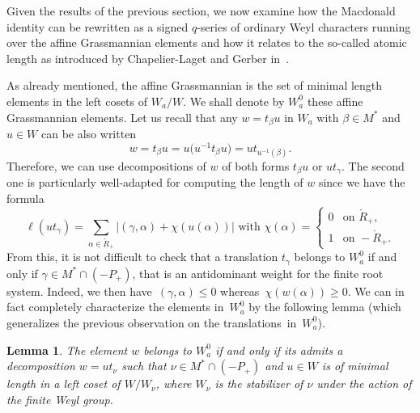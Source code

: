 \documentclass[10pt,a4paper]{amsart}
\newtheorem{Lemma}[Theorem]{Lemma}
\numberwithin{equation}{section}
\begin{document}
Given the results of the previous section, we now examine how the Macdonald identity can be rewritten as a signed $q$-series of
	ordinary Weyl characters running over the affine Grassmannian elements and how it relates to the so-called atomic length as introduced by Chapelier-Laget and Gerber in~\cite{CGT}.
	
As already mentioned, the affine Grassmannian is the set of minimal length
elements in the left cosets of $W_{a}/W$. We shall denote by $W_{a}^{0}$ these
affine Grassmannian elements. Let us recall that any $w=t_{\beta}u$ in $W_{a}$
with $\beta\in M^{\ast}$ and $u\in W$ can be also written
\[
w=t_{\beta}u=u\bigl(u^{-1}t_{\beta}u\bigr)=ut_{u^{-1}(\beta)}.
\]
Therefore, we can use decompositions of $w$ of both forms $t_{\beta}u$ or
$ut_{\gamma}$. The second one is particularly well-adapted for computing the
length of $w$ since we have the formula%
\[
\ell(ut_{\gamma})=\sum_{\alpha\in\mathring{R}_{+}}\vert (\gamma
,\alpha)+\chi(u(\alpha)) \vert \text{ with }\chi(\alpha)=
\begin{cases}
0&\text{on }\mathring{R}_{+},\\
1&\text{on } {-}\mathring{R}_{+}.
\end{cases}
\]
From this, it is not difficult to check that a translation $t_{\gamma}$
belongs to $W_{a}^{0}$ if and only if ${\gamma\in M^{\ast}\cap(-P_{+})}$, that
is an antidominant weight for the finite root system. Indeed, we then have~${(\gamma,\alpha)\leq0}$ whereas~${\chi(w(\alpha))\geq0}$. We can in fact
completely characterize the elements in~$W_{a}^{0}$ by the following lemma
\big(which generalizes the previous observation on the translations~in~$W_{a}^{0}$\big).

\begin{Lemma}
	The element $w$ belongs to $W_{a}^{0}$ if and only if its admits a
	decomposition $w=ut_{\nu}$ such that $\nu\in M^{\ast}\cap(-P_{+})$ and $ u\in
	W$ is of minimal length in a left coset of $W/W_{\nu}$, where $W_{\nu}$ is the
	stabilizer of $\nu$ under the action of the finite Weyl group.
\end{Lemma}
\end{document}
